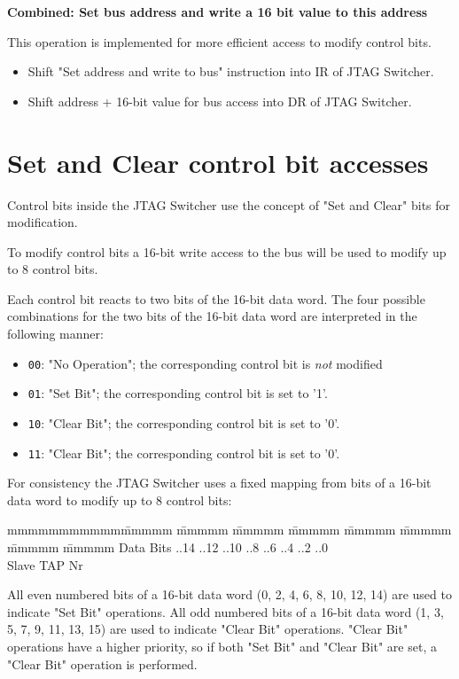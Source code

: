 \documentclass[10pt,english,a4paper]{report}
\begin{document}
{\bf Combined: Set bus address and write a 16 bit value to this address}

This operation is implemented for more efficient access to modify
control bits.
\begin{itemize}
\item Shift "Set address and write to bus" instruction into IR of JTAG Switcher.
\item Shift address + 16-bit value for bus access into DR of JTAG Switcher.
\end{itemize}

\section{Set and Clear control bit accesses}
Control bits inside the JTAG Switcher use the concept of "Set and Clear" bits
for modification.

To modify control bits a 16-bit write access to the bus will be used
to modify up to 8 control bits.

Each control bit reacts to two bits of the 16-bit data word. The four possible
combinations for the two bits of the 16-bit data word are interpreted in the
following manner:
\begin{itemize}
\item {\tt 00}: "No Operation"; the corresponding control bit is {\em not} modified
\item {\tt 01}: "Set Bit"; the corresponding control bit is set to '1'.
\item {\tt 10}: "Clear Bit"; the corresponding control bit is set to '0'.
\item {\tt 11}: "Clear Bit"; the corresponding control bit is set to '0'.
\end{itemize}

For consistency the JTAG Switcher uses a fixed mapping from bits of a
16-bit data word to modify up to 8 control bits:
\begin{tabbing}
mmmmmmmmmmm\= mmmmm \= mmmmm \= mmmmm \= mmmmm \= mmmmm \= mmmmm \= mmmmm \= mmmmm \kill
Data Bits   ..14 ..12 ..10 ..8 ..6 ..4 ..2 ..0 \\
Slave TAP Nr          \\
\end{tabbing}

All even numbered bits of a 16-bit data word (0, 2, 4, 6, 8, 10, 12, 14) are used
to indicate "Set Bit" operations. All odd numbered bits of a 16-bit data word
(1, 3, 5, 7, 9, 11, 13, 15) are used to indicate "Clear Bit" operations.
"Clear Bit" operations have a higher priority, so if both
"Set Bit" and "Clear Bit" are set, a "Clear Bit" operation is performed.
\end{document}
